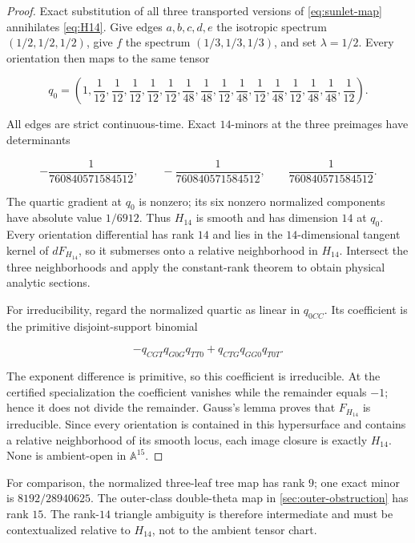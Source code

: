 \begin{proof}
Exact substitution of all three transported versions of
\eqref{eq:sunlet-map} annihilates \eqref{eq:H14}.  Give edges
\(a,b,c,d,e\) the isotropic spectrum \((1/2,1/2,1/2)\), give \(f\) the
spectrum \((1/3,1/3,1/3)\), and set \(\lambda=1/2\).  Every orientation then
maps to the same tensor

\[
q_0=\left(1,\frac1{12},\frac1{12},\frac1{12},
\frac1{12},\frac1{12},\frac1{48},\frac1{48},
\frac1{12},\frac1{48},\frac1{12},\frac1{48},
\frac1{12},\frac1{48},\frac1{48},\frac1{12}\right).
\]

All edges are strict continuous-time.  Exact \(14\)-minors at the three
preimages have determinants

\[
 -\frac1{760840571584512},\qquad
 -\frac1{760840571584512},\qquad
  \frac1{760840571584512}.
\]

The quartic gradient at \(q_0\) is nonzero; its six nonzero normalized
components have absolute value \(1/6912\).  Thus \(H_{14}\) is smooth and
has dimension \(14\) at \(q_0\).  Every orientation differential has rank
\(14\) and lies in the \(14\)-dimensional tangent kernel of \(dF_{H_{14}}\),
so it submerses onto a relative neighborhood in \(H_{14}\).  Intersect the
three neighborhoods and apply the constant-rank theorem to obtain physical
analytic sections.

For irreducibility, regard the normalized quartic as linear in \(q_{0CC}\).
Its coefficient is the primitive disjoint-support binomial

\[
 -q_{CGT}q_{G0G}q_{TT0}+q_{CTG}q_{GG0}q_{T0T}.
\]

The exponent difference is primitive, so this coefficient is irreducible.
At the certified specialization the coefficient vanishes while the remainder
equals \(-1\); hence it does not divide the remainder.  Gauss's lemma proves
that \(F_{H_{14}}\) is irreducible.  Since every orientation is contained in
this hypersurface and contains a relative neighborhood of its smooth locus,
each image closure is exactly \(H_{14}\).  None is ambient-open in
\(\mathbb A^{15}\).
\end{proof}

For comparison, the normalized three-leaf tree map has rank \(9\); one exact
minor is \(8192/28940625\).  The outer-class double-theta map in
\cref{sec:outer-obstruction} has rank \(15\).  The rank-\(14\) triangle
ambiguity is therefore intermediate and must be contextualized relative to
\(H_{14}\), not to the ambient tensor chart.

